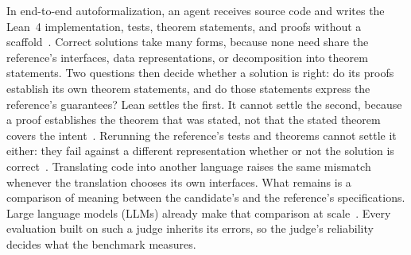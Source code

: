 In end-to-end autoformalization, an agent receives source code and writes the Lean~4 implementation, tests, theorem statements, and proofs without a scaffold~\citep{miranda2026veribench}.
Correct solutions take many forms, because none need share the reference's interfaces, data representations, or decomposition into theorem statements.
Two questions then decide whether a solution is right: do its proofs establish its own theorem statements, and do those statements express the reference's guarantees?
Lean settles the first.
It cannot settle the second, because a proof establishes the theorem that was stated, not that the stated theorem covers the intent~\citep{lahiri2024evaluating}.
Rerunning the reference's tests and theorems cannot settle it either: they fail against a different representation whether or not the solution is correct~\citep{miranda2026veribench}.
Translating code into another language raises the same mismatch whenever the translation chooses its own interfaces.
What remains is a comparison of meaning between the candidate's and the reference's specifications.
Large language models (LLMs) already make that comparison at scale~\citep{miranda2026veribench,lin2025goedelprover}.
Every evaluation built on such a judge inherits its errors, so the judge's reliability decides what the benchmark measures.

